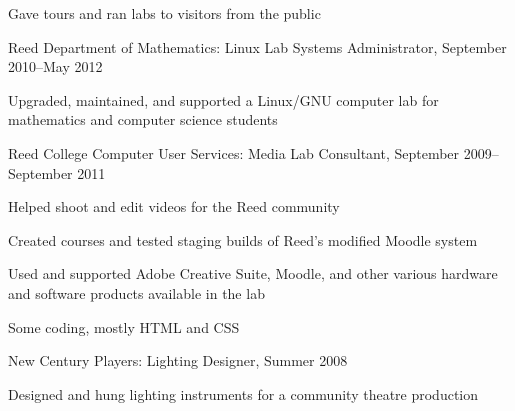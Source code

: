 \documentclass[letterpaper]{article}
\renewenvironment{itemize}{\begin{list}{}{\setlength{\leftmargin}{1.5em}}}{\end{list}}%
\begin{document}
\begin{itemize}
\begin{itemize}
	\item Gave tours and ran labs to visitors from the public
	\end{itemize}
\item Reed Department of Mathematics: Linux Lab Systems Administrator, September 2010--May 2012
	\begin{itemize}
	\item Upgraded, maintained, and supported a Linux/GNU computer lab for mathematics and computer science students
	\end{itemize}
\item Reed College Computer User Services: Media Lab Consultant, September 2009--September 2011
	\begin{itemize}
	\item Helped shoot and edit videos for the Reed community
	\item Created courses and tested staging builds of Reed's modified Moodle system 
	\item Used and supported Adobe Creative Suite, Moodle, and other various hardware and software products available in the lab
	\item Some coding, mostly HTML and CSS
	\end{itemize}
\item New Century Players: Lighting Designer, Summer 2008
	\begin{itemize}
	\item Designed and hung lighting instruments for a community theatre production
	\end{itemize}
\end{itemize}




\end{document}
